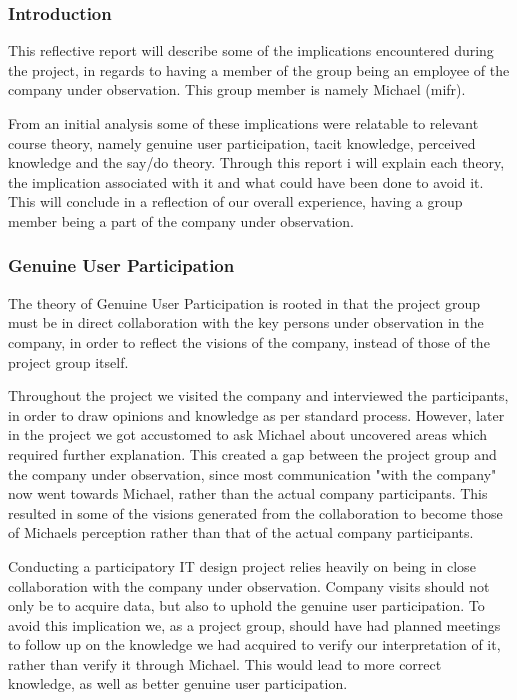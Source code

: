 \subsubsection{Introduction}

This reflective report will describe some of the implications encountered during the project, in regards to having a member of the group being an employee of the company under observation. This group member is namely Michael (mifr).


From an initial analysis some of these implications were relatable to relevant course theory, namely genuine user participation, tacit knowledge, perceived knowledge and the say/do theory.
Through this report i will explain each theory, the implication associated with it and what could have been done to avoid it.
This will conclude in a reflection of our overall experience, having a group member being a part of the company under observation.

\subsubsection{Genuine User Participation}

The theory of Genuine User Participation is rooted in that the project group must be in direct collaboration with the key persons under observation in the company, in order to reflect the visions of the company, instead of those of the project group itself.

Throughout the project we visited the company and interviewed the participants, in order to draw opinions and knowledge as per standard process. However, later in the project we got accustomed to ask Michael about uncovered areas which required further explanation. This created a gap between the project group and the company under observation, since most communication "with the company" now went towards Michael, rather than the actual company participants. This resulted in some of the visions generated from the collaboration to become those of Michaels perception rather than that of the actual company participants.

Conducting a participatory IT design project relies heavily on being in close collaboration with the company under observation. Company visits should not only be to acquire data, but also to uphold the genuine user participation. To avoid this implication we, as a project group, should have had planned meetings to follow up on the knowledge we had acquired to verify our interpretation of it, rather than verify it through Michael. This would lead to more correct knowledge, as well as better genuine user participation.

